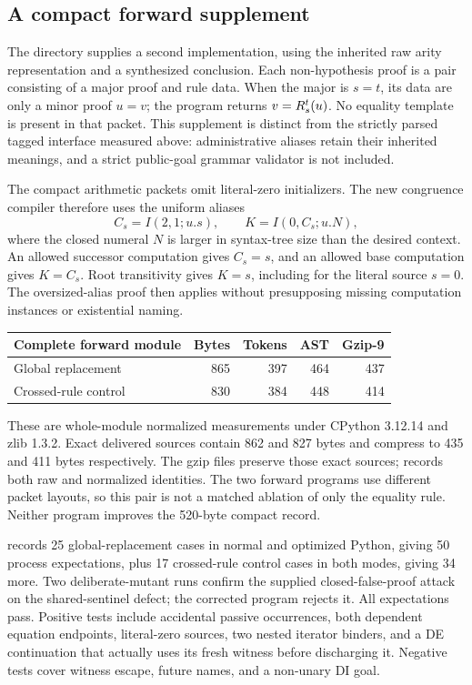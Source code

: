 \subsection{A compact forward supplement}
\label{supp:compact-forward}

The directory  supplies a second implementation, using the
inherited raw arity representation and a synthesized conclusion. Each
non-hypothesis proof is a pair consisting of a major proof and rule data.
When the major is $s=t$, its data are only a minor proof $u=v$; the program
returns $v=R_{s}^{t}(u)$. No equality template is present in that packet.
This supplement is distinct from the strictly parsed tagged interface
measured above: administrative aliases retain their inherited meanings,
and a strict public-goal grammar validator is not included.

The compact arithmetic packets omit literal-zero initializers. The new
congruence compiler therefore uses the uniform aliases
\[
 C_s=I(2,1;u.s),\qquad K=I(0,C_s;u.N),
\]
where the closed numeral $N$ is larger in syntax-tree size than the desired
context. An allowed successor computation gives $C_s=s$, and an allowed
base computation gives $K=C_s$. Root transitivity gives $K=s$, including
for the literal source $s=0$. The oversized-alias proof then applies
without presupposing missing computation instances or existential naming.

\begin{center}\small
\begin{tabular}{@{}lrrrr@{}}
\toprule
Complete forward module & Bytes & Tokens & AST & Gzip-9\\
\midrule
Global replacement &865&397&464&437\\
Crossed-rule control &830&384&448&414\\
\bottomrule
\end{tabular}
\end{center}
These are whole-module normalized measurements under CPython 3.12.14 and
zlib 1.3.2. Exact delivered sources contain 862 and 827 bytes and compress
to 435 and 411 bytes respectively. The gzip files preserve those exact
sources;  records both raw and normalized
identities. The two forward programs use different packet layouts, so
this pair is not a matched ablation of only the equality rule. Neither
program improves the 520-byte compact record.

 records 25 global-replacement cases in normal
and optimized Python, giving 50 process expectations, plus 17 crossed-rule
control cases in both modes, giving 34 more. Two deliberate-mutant runs
confirm the supplied closed-false-proof attack on the shared-sentinel
defect; the corrected program rejects it. All expectations pass. Positive
tests include accidental passive occurrences, both dependent equation
endpoints, literal-zero sources, two nested iterator binders, and a DE
continuation that actually uses its fresh witness before discharging it.
Negative tests cover witness escape, future names, and a non-unary DI goal.

